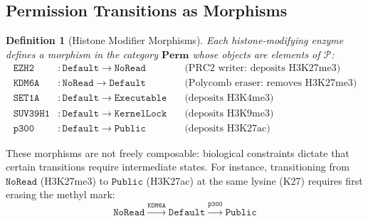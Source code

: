 \documentclass[12pt,a4paper]{article}
\newtheorem{definition}[theorem]{Definition}
\newcommand{\cat}[1]{\mathbf{#1}}
\begin{document}
\subsection{Permission Transitions as Morphisms}

\begin{definition}[Histone Modifier Morphisms]
\label{def:modifier-morphisms}
Each histone-modifying enzyme defines a morphism in the category $\cat{Perm}$ whose objects are elements of $\mathcal{P}$:
\begin{align}
    \texttt{EZH2} &: \texttt{Default} \to \texttt{NoRead} \quad &\text{(PRC2 writer: deposits H3K27me3)} \\
    \texttt{KDM6A} &: \texttt{NoRead} \to \texttt{Default} \quad &\text{(Polycomb eraser: removes H3K27me3)} \\
    \texttt{SET1A} &: \texttt{Default} \to \texttt{Executable} \quad &\text{(deposits H3K4me3)} \\
    \texttt{SUV39H1} &: \texttt{Default} \to \texttt{KernelLock} \quad &\text{(deposits H3K9me3)} \\
    \texttt{p300} &: \texttt{Default} \to \texttt{Public} \quad &\text{(deposits H3K27ac)}
\end{align}
\end{definition}

These morphisms are not freely composable: biological constraints dictate that certain transitions require intermediate states. For instance, transitioning from $\texttt{NoRead}$ (H3K27me3) to $\texttt{Public}$ (H3K27ac) at the same lysine (K27) requires first erasing the methyl mark:
\[
    \texttt{NoRead} \xrightarrow{\texttt{KDM6A}} \texttt{Default} \xrightarrow{\texttt{p300}} \texttt{Public}
\]
\end{document}
